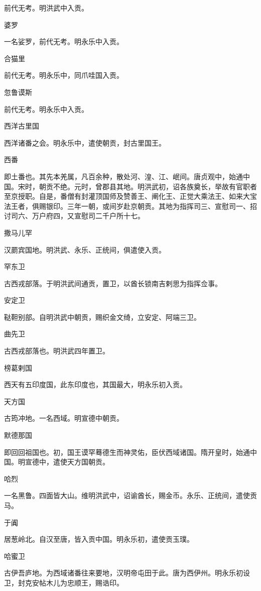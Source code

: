 \documentclass[a4paper,12pt,UTF8,twoside]{ctexbook}
\begin{document}
    前代无考。明洪武中入贡。
    
    婆罗
    
    一名娑罗，前代无考。明永乐中入贡。
    
    合猫里
    
    前代无考。明永乐中，同爪哇国入贡。
    
    忽鲁谟斯
    
    前代无考。明永乐中入贡。
    
    西洋古里国
    
    西洋诸番之会。明永乐中，遣使朝贡，封古里国王。
    
    西番
    
    即土番也。其先本羌属，凡百余种，散处河、湟、江、岷间。唐贞观中，始通中国。宋时，朝贡不绝。元时，曾郡县其地。明洪武初，诏各族奠长，举故有官职者至京授职。自是，番僧有封灌顶国师及赞善王、阐化王、正觉大乘法王、如来大宝法王者，俱赐银印。三年一朝，或间岁赴京朝贡。其地为指挥司三、宣慰司一、招讨司六、万户府四，又宣慰司二千户所十七。
    
    撒马儿罕
    
    汉罽宾国地。明洪武、永乐、正统间，俱遣使入贡。
    
    罕东卫
    
    古西戎部落。于明洪武间通贡，置卫，以酋长锁南吉剌思为指挥佥事。
    
    安定卫
    
    鞑靼别部。自明洪武中朝贡，赐织金文绮，立安定、阿端三卫。
    
    曲先卫
    
    古西戎部落也。明洪武四年置卫。
    
    榜葛剌国
    
    西天有五印度国，此东印度也，其国最大，明永乐初入贡。
    
    天方国
    
    古筠冲地。一名西域。明宣德中朝贡。
    
    默德那国
    
    即回回祖国也。初，国王谟罕蓦德生而神灵佑，臣伏西域诸国。隋开皇时，始通中国。明宣德中，遣使天方国朝贡。
    
    哈烈
    
    一名黑鲁。四面皆大山。维明洪武中，诏谕酋长，赐金币。永乐、正统间，遣使贡马。
    
    于阗
    
    居葱岭北。自汉至唐，皆入贡中国。明永乐初，遣使贡玉璞。
    
    哈蜜卫
    
    古伊吾庐地。为西域诸番往来要地，汉明帝屯田于此。唐为西伊州。明永乐初设卫，封克安帖木儿为忠顺王，赐诰印。
    
\end{document}
